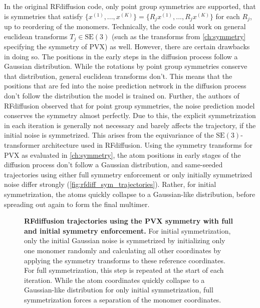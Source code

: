 In the original RFdiffusion code, only point group symmetries are supported, that is symmetries that satisfy $\{x^{(1)}, ..., x^{(K)}\} = \{R_j x^{(1)}, ..., R_j x^{(K)}\}$ for each $R_j$, up to reordering of the monomers. Technically, the code could work on general euclidean transforms $T_j \in \mathrm{SE}(3)$ (such as the transforms from \autoref{ch:symmetry} specifying the symmetry of PVX) as well. However, there are certain drawbacks in doing so. The positions in the early steps in the diffusion process follow a Gaussian distribution. While the rotations by point group symmetries conserve that distribution, general euclidean transforms don't. This means that the positions that are fed into the noise prediction network in the diffusion process don't follow the distribution the model is trained on. Further, the authors of RFdiffusion observed that for point group symmetries, the noise prediction model conserves the symmetry almost perfectly. Due to this, the explicit symmetrization in each iteration is generally not necessary and barely affects the trajectory, if the initial noise is symmetrized. This arises from the equivariance of the $\mathrm{SE}(3)$-transformer architecture used in RFdiffusion. Using the symmetry transforms for PVX as evaluated in \autoref{ch:symmetry}, the atom positions in early stages of the diffusion process don't follow a Gaussian distribution, and same-seeded trajectories using either full symmetry enforcement or only initially symmetrized noise differ strongly (\autoref{fig:rfdiff_sym_trajectories}). Rather, for initial symmetrization, the atoms quickly collapse to a Gaussian-like distribution, before spreading out again to form the final multimer.

\begin{figure}[!hbtp]
    \centering
    
    \caption{\textbf{RFdiffusion trajectories using the PVX symmetry with full and initial symmetry enforcement. } For initial symmetrization, only the initial Gaussian noise is symmetrized by initializing only one monomer randomly and calculating all other coordinates by applying the symmetry transforms to these reference coordinates. For full symmetrization, this step is repeated at the start of each iteration. While the atom coordinates quickly collapse to a Gaussian-like distribution for only initial symmetrization, full symmetrization forces a separation of the monomer coordinates. }
    \label{fig:rfdiff_sym_trajectories}
\end{figure}

